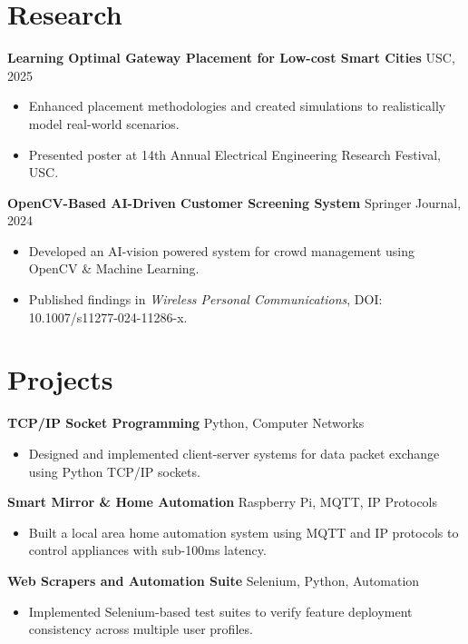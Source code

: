 \documentclass[letterpaper,10pt]{article}
\begin{document}
\section*{Research}
    \textbf{Learning Optimal Gateway Placement for Low-cost Smart Cities} \hfill USC, 2025
    \begin{itemize}[leftmargin=*]
        \item Enhanced placement methodologies and created simulations to realistically model real-world scenarios.
        \item Presented poster at 14th Annual Electrical Engineering Research Festival, USC.
    \end{itemize}
    
    \textbf{OpenCV-Based AI-Driven Customer Screening System} \hfill Springer Journal, 2024
    \begin{itemize}[leftmargin=*]
        \item Developed an AI-vision powered system for crowd management using OpenCV \& Machine Learning.
        \item Published findings in \textit{Wireless Personal Communications}, DOI: 10.1007/s11277-024-11286-x.
    \end{itemize}

\section*{Projects}
    \textbf{TCP/IP Socket Programming} \hfill Python, Computer Networks
    \begin{itemize}[leftmargin=*]
        \item Designed and implemented client-server systems for data packet exchange using Python TCP/IP sockets.
    \end{itemize}

    \textbf{Smart Mirror \& Home Automation} \hfill Raspberry Pi, MQTT, IP Protocols
    \begin{itemize}[leftmargin=*]
        \item Built a local area home automation system using MQTT and IP protocols to control appliances with sub-100ms latency.
    \end{itemize}

    \textbf{Web Scrapers and Automation Suite} \hfill Selenium, Python, Automation
    \begin{itemize}[leftmargin=*]
        \item Implemented Selenium-based test suites to verify feature deployment consistency across multiple user profiles.
    \end{itemize}
\end{document}
